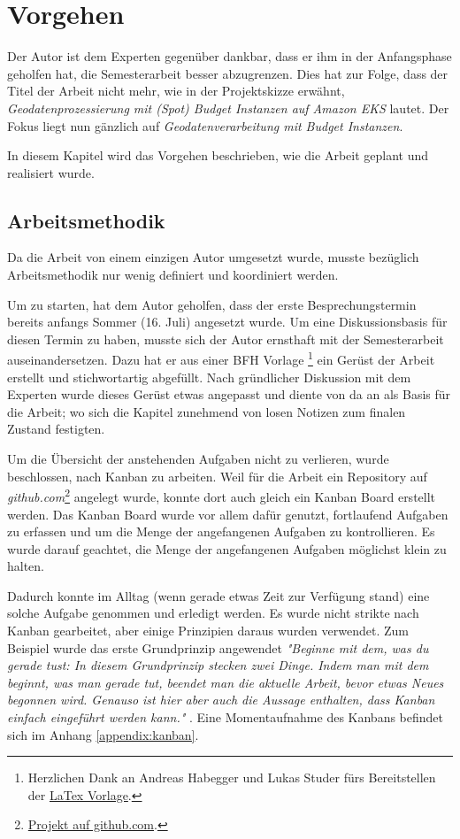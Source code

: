\section{Vorgehen}
Der Autor ist dem Experten \prof\space gegenüber dankbar, dass er ihm in der Anfangsphase geholfen hat, die Semesterarbeit besser abzugrenzen. Dies hat zur Folge, dass der Titel der Arbeit nicht mehr, wie in der Projektskizze erwähnt, \textit{Geodatenprozessierung mit (Spot) Budget Instanzen auf Amazon EKS} lautet. Der Fokus liegt nun gänzlich auf \textit{Geodatenverarbeitung mit Budget Instanzen}.

In diesem Kapitel wird das Vorgehen beschrieben, wie die Arbeit geplant und realisiert wurde. 

\subsection{Arbeitsmethodik}
Da die Arbeit von einem einzigen Autor umgesetzt wurde, musste bezüglich Arbeitsmethodik nur wenig definiert und koordiniert werden.

Um zu starten, hat dem Autor geholfen, dass der erste Besprechungstermin bereits anfangs Sommer (16. Juli) angesetzt wurde. Um eine Diskussionsbasis für diesen Termin zu haben, musste sich der Autor ernsthaft mit der Semesterarbeit auseinandersetzen. Dazu hat er aus einer BFH Vorlage \footnote{Herzlichen Dank an Andreas Habegger und Lukas Studer fürs Bereitstellen der \href{https://gitlab.ti.bfh.ch/latex-utils/tpl_latex-thesis}{LaTex Vorlage}.} ein Gerüst der Arbeit erstellt und stichwortartig abgefüllt. Nach gründlicher Diskussion mit dem Experten wurde dieses Gerüst etwas angepasst und diente von da an als Basis für die Arbeit; wo sich die Kapitel zunehmend von losen Notizen zum finalen Zustand festigten.

Um die Übersicht der anstehenden Aufgaben nicht zu verlieren, wurde beschlossen, nach Kanban zu arbeiten. Weil für die Arbeit ein Repository auf \emph{github.com}\footnote{\href{https://github.com/bfh-semesterarbeit/spot-geoprocessing/projects/1}{Projekt auf github.com}.} angelegt wurde, konnte dort auch gleich ein Kanban Board erstellt werden. Das Kanban Board wurde vor allem dafür genutzt, fortlaufend Aufgaben zu erfassen und um die Menge der angefangenen Aufgaben zu kontrollieren. Es wurde darauf geachtet, die Menge der angefangenen Aufgaben möglichst klein zu halten.

Dadurch konnte im Alltag (wenn gerade etwas Zeit zur Verfügung stand) eine solche Aufgabe genommen und erledigt werden. Es wurde nicht strikte nach Kanban gearbeitet, aber einige Prinzipien daraus wurden verwendet. Zum Beispiel wurde das erste Grundprinzip angewendet \textit{"Beginne mit dem, was du gerade tust:
In diesem Grundprinzip stecken zwei Dinge. Indem man mit dem beginnt, was man gerade tut, beendet man die aktuelle Arbeit, bevor etwas Neues begonnen wird. Genauso ist hier aber auch die Aussage enthalten, dass Kanban einfach eingeführt werden kann."} \cite{kanban2010}. Eine Momentaufnahme des Kanbans befindet sich im Anhang \ref{appendix:kanban}.

